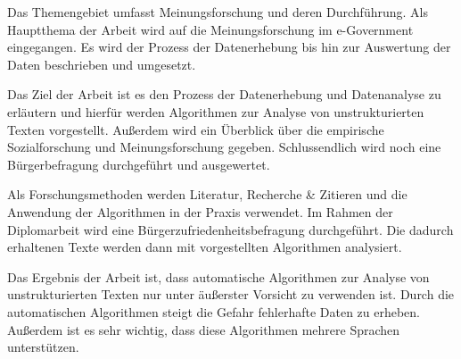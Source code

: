 

 Das Themengebiet umfasst Meinungsforschung und deren Durchführung. Als Hauptthema der Arbeit wird
auf die Meinungsforschung im e-Government eingegangen. Es wird der Prozess der Datenerhebung bis hin zur Auswertung
der Daten beschrieben und umgesetzt. \cite[Kap.~1]{Hedayati-Rad2008}

 Das Ziel der Arbeit ist es den Prozess der Datenerhebung und Datenanalyse zu erläutern und
hierfür werden Algorithmen zur Analyse von unstrukturierten Texten vorgestellt. Außerdem wird ein Überblick über die
empirische Sozialforschung und Meinungsforschung gegeben. Schlussendlich wird noch eine Bürgerbefragung durchgeführt 
und ausgewertet. \cite[Kap.~1]{Hedayati-Rad2008}

 Als Forschungsmethoden werden Literatur, Recherche \& Zitieren und die Anwendung der
Algorithmen in der Praxis verwendet. Im Rahmen der Diplomarbeit wird eine Bürgerzufriedenheitsbefragung durchgeführt. 
Die dadurch erhaltenen Texte werden dann mit vorgestellten Algorithmen analysiert. \cite[Kap.~1,8]{Hedayati-Rad2008}

 Das Ergebnis der Arbeit ist, dass automatische Algorithmen zur Analyse von unstrukturierten Texten 
nur unter äußerster Vorsicht zu verwenden ist. Durch die automatischen Algorithmen steigt die Gefahr fehlerhafte Daten
zu erheben. Außerdem ist es sehr wichtig, dass diese Algorithmen mehrere Sprachen unterstützen. \cite[Kap.~9]{Hedayati-Rad2008}


%
\section*{\thesisheading} %


